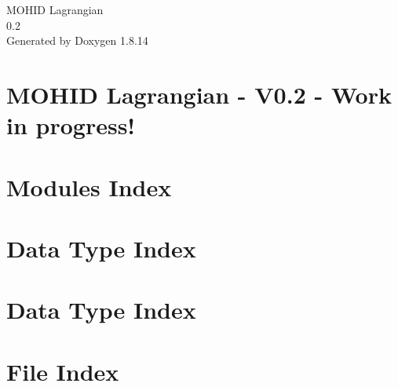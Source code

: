 \documentclass[twoside]{book}
\newcommand{\+}{\discretionary{\mbox{\scriptsize$\hookleftarrow$}}{}{}}
\newcommand{\clearemptydoublepage}{%
  \newpage{\pagestyle{empty}\cleardoublepage}%
}
\begin{document}
\hypersetup{pageanchor=false,
             bookmarksnumbered=true,
             pdfencoding=unicode
            }
\begin{titlepage}
\vspace*{7cm}
\begin{center}%
{\Large M\+O\+H\+ID Lagrangian \\[1ex]\large 0.\+2 }\\
\vspace*{1cm}
{\large Generated by Doxygen 1.8.14}\\
\end{center}
\end{titlepage}
\clearemptydoublepage
{}
\tableofcontents
\clearemptydoublepage
{}
\hypersetup{pageanchor=true}

\chapter{M\+O\+H\+ID Lagrangian -\/ V0.2 -\/ Work in progress!}
\label{index}\hypertarget{index}{}
\chapter{Modules Index}

\chapter{Data Type Index}

\chapter{Data Type Index}

\chapter{File Index}

\end{document}
